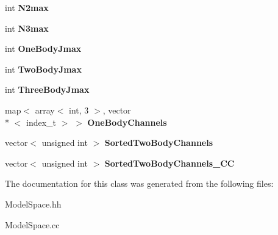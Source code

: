 \begin{DoxyCompactItemize}
\item 
\hypertarget{classModelSpace_a60db71713d3964af214756163ba0585e}{int {\bfseries N2max}}\label{classModelSpace_a60db71713d3964af214756163ba0585e}

\item 
\hypertarget{classModelSpace_ab28d5ba1838ef9d91a3f7c570530ca7c}{int {\bfseries N3max}}\label{classModelSpace_ab28d5ba1838ef9d91a3f7c570530ca7c}

\item 
\hypertarget{classModelSpace_a4c8f0a4476a3b3da3fced59d899f0134}{int {\bfseries One\-Body\-Jmax}}\label{classModelSpace_a4c8f0a4476a3b3da3fced59d899f0134}

\item 
\hypertarget{classModelSpace_aa2fd94965eb8a508e5ea7d4c879bae0b}{int {\bfseries Two\-Body\-Jmax}}\label{classModelSpace_aa2fd94965eb8a508e5ea7d4c879bae0b}

\item 
\hypertarget{classModelSpace_af9ca130d96f582d0ed1a4ef5373bcd05}{int {\bfseries Three\-Body\-Jmax}}\label{classModelSpace_af9ca130d96f582d0ed1a4ef5373bcd05}

\item 
\hypertarget{classModelSpace_add00e0a37f8597748f903dffb1c5b2a5}{map$<$ array$<$ int, 3 $>$, vector\\*
$<$ index\-\_\-t $>$ $>$ {\bfseries One\-Body\-Channels}}\label{classModelSpace_add00e0a37f8597748f903dffb1c5b2a5}

\item 
\hypertarget{classModelSpace_aaea26da5a75b807edc787f99ac7df922}{vector$<$ unsigned int $>$ {\bfseries Sorted\-Two\-Body\-Channels}}\label{classModelSpace_aaea26da5a75b807edc787f99ac7df922}

\item 
\hypertarget{classModelSpace_a9707a32e9f56698cd10cece2843f1478}{vector$<$ unsigned int $>$ {\bfseries Sorted\-Two\-Body\-Channels\-\_\-\-C\-C}}\label{classModelSpace_a9707a32e9f56698cd10cece2843f1478}

\end{DoxyCompactItemize}


The documentation for this class was generated from the following files\-:\begin{DoxyCompactItemize}
\item 
Model\-Space.\-hh\item 
Model\-Space.\-cc\end{DoxyCompactItemize}
